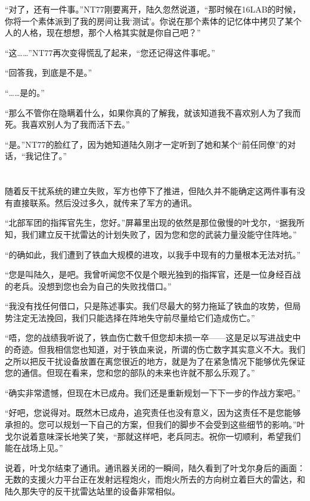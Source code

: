 “对了，还有一件事。”NT77刚要离开，陆久忽然说道，“那时候在16LAB的时候，你将一个素体派到了我的房间让我‘测试’。你说在那个素体的记忆体中拷贝了某个人的人格，现在想想，那个人格其实就是你自己吧？”

“这……”NT77再次变得慌乱了起来，“您还记得这件事呢。”

“回答我，到底是不是。”

“……是的。”

“那么不管你在隐瞒着什么，如果你真的了解我，就该知道我不喜欢别人为了我而死。我喜欢别人为了我而活下去。”

“是。”NT77的脸红了，因为她知道陆久刚才一定听到了她和某个“前任同僚”的对话，“我记住了。” 

\section*{}

随着反干扰系统的建立失败，军方也停下了推进，但陆久并不能确定这两件事有没有直接联系。然后没过多久，就传来了军方的通讯。

“北部军团的指挥官先生，您好。”屏幕里出现的依然是那位傲慢的叶戈尔，“据我所知，我们建立反干扰雷达的计划失败了，因为您和您的武装力量没能守住阵地。”

“的确如此，我们遭到了铁血大规模的进攻，以我手中现有的力量根本无法对抗。”

“您是叫陆久，是吧。我曾听闻您不仅是个眼光独到的指挥官，还是一位身经百战的老兵。没想到您也会为自己的失败找借口。”

“我没有找任何借口，只是陈述事实。我们尽最大的努力拖延了铁血的攻势，但局势注定无法挽回，我们只能选择在阵地失守前尽量给它们造成伤亡。”

“唔，您的战绩我听说了，铁血伤亡数千但您却未损一卒——这是足以写进战史中的奇迹。但我相信您也知道，对于铁血来说，所谓的伤亡数字其实意义不大。我们之所以把反干扰设备放置在离您很近的地方，就是为了在紧急情况下能够优先保证您的通信。但现在看来，您和您的部队的未来也许就不那么乐观了。”

“确实非常遗憾，但现在木已成舟。我们还是重新规划一下下一步的作战方案吧。”

“好吧，您说得对。既然木已成舟，追究责任也没有意义，因为这责任不是您能够承担的。您可以规划一下自己的方案，但我们的脚步不会受到这些细节的影响。”叶戈尔说着意味深长地笑了笑，“那就这样吧，老兵同志。祝你一切顺利，希望我们能在战场上见。”

说着，叶戈尔结束了通讯。通讯器关闭的一瞬间，陆久看到了叶戈尔身后的画面：无数的支援火力平台正在发射远程炮火，而炮火所去的方向树立着巨大的雷达，和陆久那失守的反干扰雷达站里的设备非常相似。


